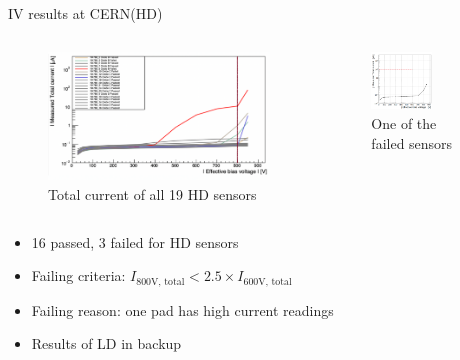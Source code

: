 \documentclass{beamer}
\begin{document}
\begin{frame}{IV results at CERN(HD) }
   \begin{columns}
        \begin{figure}
            \includegraphics[width=1.0\textwidth]{plots/HD_totalIV.png}
            \caption{Total current of all 19 HD sensors}
        \end{figure}

        \begin{figure}
            \includegraphics[width=0.6\textwidth]{plots/IV_Failed.png}
            \caption{One of the failed sensors}
        \end{figure}

    \end{columns}

    \begin{itemize}
        \item \alert{16 passed}, \alert{3 failed} for HD sensors
        \item Failing criteria:  $I_\text{800V, total} < 2.5 \times I_\text{600V, total}$
        \item Failing reason: one pad has high current readings
        \item Results of LD in backup
    \end{itemize}
\end{frame}
\end{document}
